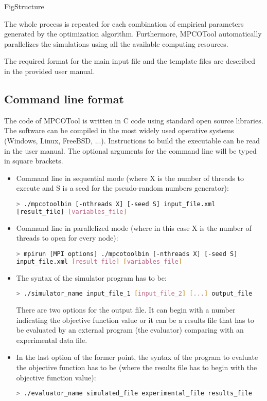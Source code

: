 \documentclass[review,authoryear]{elsarticle}
\begin{document}
{FigStructure}

The whole process is repeated for each combination of empirical parameters generated by the optimization algorithm. Furthermore, MPCOTool automatically parallelizes the simulations using all the available computing resources.

The required format for the main input file and the template files are described in the provided user manual.

\subsection{Command line format}

The code of MPCOTool is written in C code using standard open source libraries. The software can be compiled in the most widely used operative systems (Windows, Linux, FreeBSD, ...). Instructions to build the executable can be read in the user manual. The optional arguments for the command line will be typed in square brackets.

\begin{itemize}

\item Command line in sequential mode (where X is the number of threads to
execute and S is a seed for the pseudo-random numbers generator):
\begin{lstlisting}[language=bash,basicstyle=\scriptsize]
> ./mpcotoolbin [-nthreads X] [-seed S] input_file.xml
[result_file] [variables_file]
\end{lstlisting}

\item Command line in parallelized mode (where in this case X is the number of
threads to open for every node):
\begin{lstlisting}[language=bash,basicstyle=\scriptsize]
> mpirun [MPI options] ./mpcotoolbin [-nthreads X] [-seed S]
input_file.xml [result_file] [variables_file]
\end{lstlisting}

\item The syntax of the simulator program has to be:
\begin{lstlisting}[language=bash,basicstyle=\scriptsize]
> ./simulator_name input_file_1 [input_file_2] [...] output_file
\end{lstlisting}
There are two options for the output file. It can begin with a number indicating
the objective function value or it can be a results file that has to be
evaluated by an external program (the evaluator) comparing with an experimental
data file.

\item In the last option of the former point, the syntax of the program to
evaluate the objective function has to be (where the results file has to begin
with the objective function value):
\begin{lstlisting}[language=bash,basicstyle=\scriptsize]
> ./evaluator_name simulated_file experimental_file results_file
\end{lstlisting}

\end{itemize}
\end{document}

